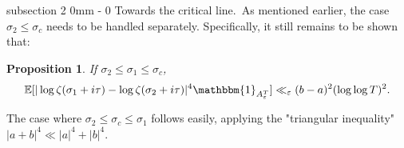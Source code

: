 \documentclass{article}
\makeatletter
\newcommand{\1}{\mathds{1}}
\numberwithin{equation}{section}
\newcommand{\eps}{\varepsilon}
\renewcommand{\leq}{\leqslant}
\newcommand{\E}{\mathbb{E}}
\theoremstyle{plain} %
\newtheorem{proposition}[theorem]{Proposition}
\renewcommand{\subsection}{\@startsection
{subsection}%
{2}%
{0mm}%
{-\baselineskip}%
{0 \baselineskip}%
{\normalfont\bf\itshape}} %
\makeatother
\begin{document}
\subsection{Towards the critical line}.\ 
As mentioned earlier, the case $\sigma_2 \leq \sigma_c$ needs to be handled separately. Specifically, it still remains to be shown that:
\begin{proposition}
\label{useabove}
    If $\sigma_2 \leq \sigma_1 \leq \sigma_c$,
\begin{equation}
    \E[|\log \zeta (\sigma_1 + i \tau) - \log \zeta (\sigma_2 + i \tau)|^4 \mathbbm{1}_{A_\eps^T}] \ll_\eps (b-a)^2(\log \log T)^2.
\end{equation}
\end{proposition}

The case where $\sigma_2 \leq \sigma_c \leq \sigma_1$ follows easily, applying the "triangular inequality" $|a+b|^4 \ll |a|^4 + |b|^4$.
\end{document}

